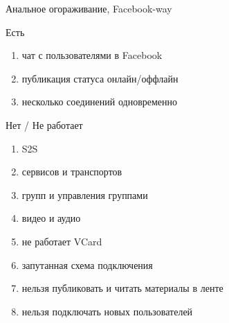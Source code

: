 {
\begin{frame}{Анальное огораживание, Facebook-way}
  \begin{block}{Есть}
    \begin{enumerate}
      \item чат с пользователями в Facebook
      \item публикация статуса онлайн/оффлайн
      \item несколько соединений одновременно
    \end{enumerate}
  \end{block} 
  \pause

  \begin{block}{Нет / Не работает}
    \begin{enumerate}
      \item S2S
      \item сервисов и транспортов
      \item групп и управления группами
      \item видео и аудио
      \item не работает VCard 
      \item запутанная схема подключения
      \item нельзя публиковать и читать материалы в ленте
      \item нельзя подключать новых пользователей
    \end{enumerate}
  \end{block}
\end{frame}
}

